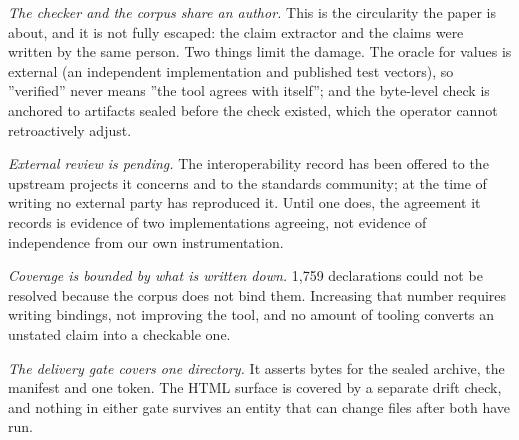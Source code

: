 \emph{The checker and the corpus share an author.} This is the circularity the
paper is about, and it is not fully escaped: the claim extractor and the claims
were written by the same person. Two things limit the damage. The oracle for
values is external (an independent implementation and published test vectors),
so ''verified'' never means ''the tool agrees with itself''; and the byte-level
check is anchored to artifacts sealed before the check existed, which the
operator cannot retroactively adjust.

\emph{External review is pending.} The interoperability record has been offered
to the upstream projects it concerns and to the standards community; at the time
of writing no external party has reproduced it. Until one does, the agreement it
records is evidence of two implementations agreeing, not evidence of
independence from our own instrumentation.

\emph{Coverage is bounded by what is written down.} 1{,}759 declarations could
not be resolved because the corpus does not bind them. Increasing that number
requires writing bindings, not improving the tool, and no amount of tooling
converts an unstated claim into a checkable one.

\emph{The delivery gate covers one directory.} It asserts bytes for the sealed
archive, the manifest and one token. The HTML surface is covered by a separate
drift check, and nothing in either gate survives an entity that can change files
after both have run.

